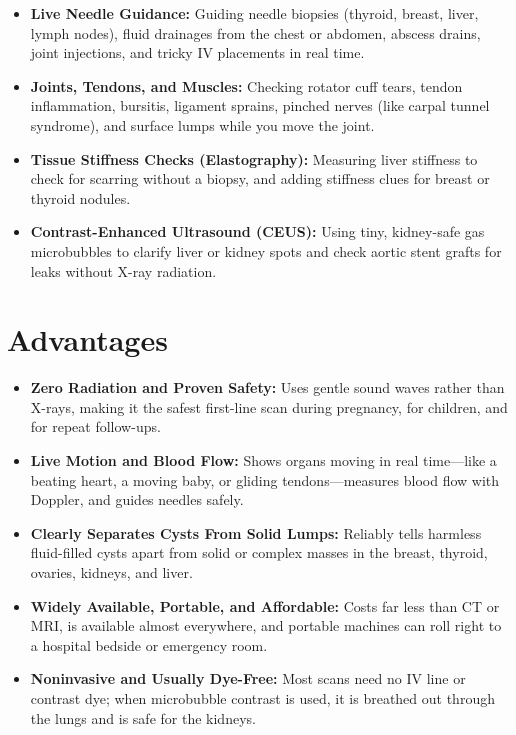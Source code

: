 \begin{itemize}
    \item \textbf{Live Needle Guidance:} Guiding needle biopsies (thyroid, breast, liver, lymph nodes), fluid drainages from the chest or abdomen, abscess drains, joint injections, and tricky IV placements in real time.
    \item \textbf{Joints, Tendons, and Muscles:} Checking rotator cuff tears, tendon inflammation, bursitis, ligament sprains, pinched nerves (like carpal tunnel syndrome), and surface lumps while you move the joint.
    \item \textbf{Tissue Stiffness Checks (Elastography):} Measuring liver stiffness to check for scarring without a biopsy, and adding stiffness clues for breast or thyroid nodules.
    \item \textbf{Contrast-Enhanced Ultrasound (CEUS):} Using tiny, kidney-safe gas microbubbles to clarify liver or kidney spots and check aortic stent grafts for leaks without X-ray radiation.
\end{itemize}

\section{Advantages}

\begin{itemize}
    \item \textbf{Zero Radiation and Proven Safety:} Uses gentle sound waves rather than X-rays, making it the safest first-line scan during pregnancy, for children, and for repeat follow-ups.
    \item \textbf{Live Motion and Blood Flow:} Shows organs moving in real time---like a beating heart, a moving baby, or gliding tendons---measures blood flow with Doppler, and guides needles safely.
    \item \textbf{Clearly Separates Cysts From Solid Lumps:} Reliably tells harmless fluid-filled cysts apart from solid or complex masses in the breast, thyroid, ovaries, kidneys, and liver.
    \item \textbf{Widely Available, Portable, and Affordable:} Costs far less than CT or MRI, is available almost everywhere, and portable machines can roll right to a hospital bedside or emergency room.
    \item \textbf{Noninvasive and Usually Dye-Free:} Most scans need no IV line or contrast dye; when microbubble contrast is used, it is breathed out through the lungs and is safe for the kidneys.
\end{itemize}

